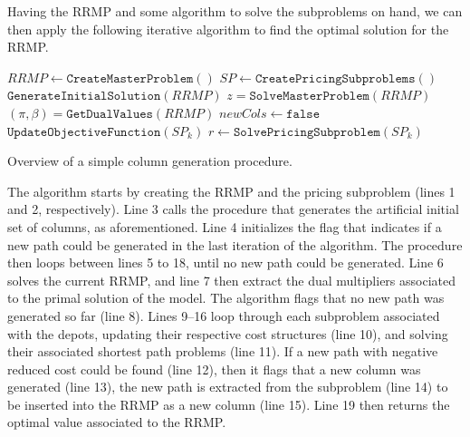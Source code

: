 \documentclass{article}
\begin{document}
\vspace{12pt}

Having the RRMP and some algorithm to solve the subproblems on hand, we can then apply the following iterative algorithm to find the optimal solution for the RRMP.

\begin{algorithm}
   $\mathit{RRMP} \gets \mathtt{CreateMasterProblem()}$\;
   $\mathit{SP} \gets \mathtt{CreatePricingSubproblems}()$\;
   $\mathtt{GenerateInitialSolution}(\mathit{RRMP})$\;
    {
      $z = \mathtt{SolveMasterProblem}(\mathit{RRMP})$\;
      $(\pi, \beta) = \mathtt{GetDualValues}(\mathit{RRMP})$\;
      $\mathit{newCols} \gets \mathtt{false}$\;
      \BlankLine
       {
         $\mathtt{UpdateObjectiveFunction}(\mathit{SP}_k)$\;
         $r \gets \mathtt{SolvePricingSubproblem}(\mathit{SP}_k)$\;
         \BlankLine
      }
   }
   \caption{Overview of a simple column generation procedure.}
\end{algorithm}

The algorithm starts by creating the RRMP and the pricing subproblem (lines 1 and 2, respectively). Line 3 calls the procedure that generates the artificial initial set of columns, as aforementioned. Line 4 initializes the flag that indicates if a new path could be generated in the last iteration of the algorithm. The procedure then loops between lines 5 to 18, until no new path could be generated. Line 6 solves the current RRMP, and line 7 then extract the dual multipliers associated to the primal solution of the model. The algorithm flags that no new path was generated so far (line 8). Lines 9--16 loop through each subproblem associated with the depots, updating their respective cost structures (line 10), and solving their associated shortest path problems (line 11). If a new path with negative reduced cost could be found (line 12), then it flags that a new column was generated (line 13), the new path is extracted from the subproblem (line 14) to be inserted into the RRMP as a new column (line 15). Line 19 then returns the optimal value associated to the RRMP.
\end{document}

